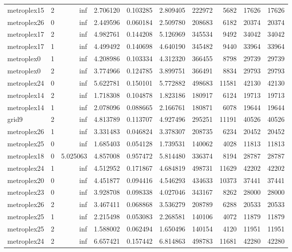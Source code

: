\begin{longtable}{|l|r|r|r|r|r|r|r|r|r|}
metroplex15 & 2 & inf & 2.706120 & 0.103285 & 2.809405 & 222972 & 5682 & 17626 & 17626 \\
metroplex26 & 0 & inf & 2.449596 & 0.060184 & 2.509780 & 208683 & 6182 & 20374 & 20374 \\
metroplex17 & 2 & inf & 4.982761 & 0.144208 & 5.126969 & 345534 & 9492 & 34042 & 34042 \\
metroplex17 & 1 & inf & 4.499492 & 0.140698 & 4.640190 & 345482 & 9440 & 33964 & 33964 \\
metroplex0 & 1 & inf & 4.208986 & 0.103334 & 4.312320 & 366455 & 8798 & 29739 & 29739 \\
metroplex0 & 2 & inf & 3.774966 & 0.124785 & 3.899751 & 366491 & 8834 & 29793 & 29793 \\
metroplex24 & 0 & inf & 5.622781 & 0.150101 & 5.772882 & 498683 & 11581 & 42130 & 42130 \\
metroplex14 & 2 & inf & 1.718308 & 0.104878 & 1.823186 & 180917 & 6124 & 19713 & 19713 \\
metroplex14 & 1 & inf & 2.078096 & 0.088665 & 2.166761 & 180871 & 6078 & 19644 & 19644 \\
grid9 & 2 & inf & 4.813789 & 0.113707 & 4.927496 & 295251 & 11191 & 40526 & 40526 \\
metroplex26 & 1 & inf & 3.331483 & 0.046824 & 3.378307 & 208735 & 6234 & 20452 & 20452 \\
metroplex25 & 0 & inf & 1.685403 & 0.054128 & 1.739531 & 140062 & 4028 & 11813 & 11813 \\
metroplex18 & 0 & 5.025063 & 4.857008 & 0.957472 & 5.814480 & 336374 & 8194 & 28787 & 28787 \\
metroplex24 & 1 & inf & 4.512952 & 0.171867 & 4.684819 & 498731 & 11629 & 42202 & 42202 \\
metroplex20 & 0 & inf & 4.451877 & 0.094416 & 4.546293 & 434633 & 10373 & 37441 & 37441 \\
metroplex23 & 0 & inf & 3.928708 & 0.098338 & 4.027046 & 343167 & 8262 & 28000 & 28000 \\
metroplex26 & 2 & inf & 3.467411 & 0.068868 & 3.536279 & 208789 & 6288 & 20533 & 20533 \\
metroplex25 & 1 & inf & 2.215498 & 0.053083 & 2.268581 & 140106 & 4072 & 11879 & 11879 \\
metroplex25 & 2 & inf & 1.588002 & 0.062494 & 1.650496 & 140154 & 4120 & 11951 & 11951 \\
metroplex24 & 2 & inf & 6.657421 & 0.157442 & 6.814863 & 498783 & 11681 & 42280 & 42280 \\

\end{longtable}

